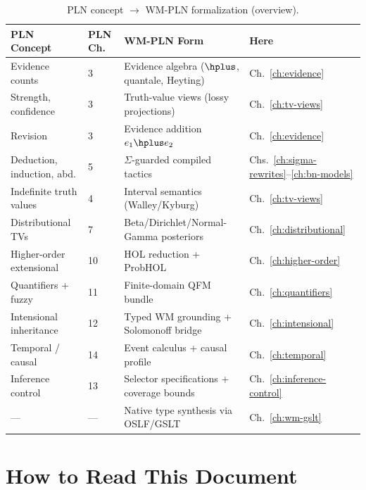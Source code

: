 \documentclass[11pt,openany]{report}
\begin{document}
\begin{table}[ht]
\centering
\caption{PLN concept $\to$ WM-PLN formalization (overview).}
\label{tab:concept-map}
\begin{tabular}{@{}llll@{}}
\toprule
\textbf{PLN Concept} & \textbf{PLN Ch.} & \textbf{WM-PLN Form} & \textbf{Here} \\
\midrule
Evidence counts           & 3  & Evidence algebra ($\hplus$, quantale, Heyting) & Ch.~\ref{ch:evidence} \\
Strength, confidence      & 3  & Truth-value views (lossy projections)           & Ch.~\ref{ch:tv-views} \\
Revision                  & 3  & Evidence addition $e_1 \hplus e_2$              & Ch.~\ref{ch:evidence} \\
Deduction, induction, abd.& 5  & $\Sigma$-guarded compiled tactics               & Chs.~\ref{ch:sigma-rewrites}--\ref{ch:bn-models} \\
Indefinite truth values   & 4  & Interval semantics (Walley/Kyburg)              & Ch.~\ref{ch:tv-views} \\
Distributional TVs        & 7  & Beta/Dirichlet/Normal-Gamma posteriors           & Ch.~\ref{ch:distributional} \\
Higher-order extensional  & 10 & HOL reduction + ProbHOL                         & Ch.~\ref{ch:higher-order} \\
Quantifiers + fuzzy       & 11 & Finite-domain QFM bundle                        & Ch.~\ref{ch:quantifiers} \\
Intensional inheritance   & 12 & Typed WM grounding + Solomonoff bridge           & Ch.~\ref{ch:intensional} \\
Temporal / causal         & 14 & Event calculus + causal profile                  & Ch.~\ref{ch:temporal} \\
Inference control         & 13 & Selector specifications + coverage bounds        & Ch.~\ref{ch:inference-control} \\
---                       & ---& Native type synthesis via OSLF/GSLT              & Ch.~\ref{ch:wm-gslt} \\
\bottomrule
\end{tabular}
\end{table}

\section{How to Read This Document}
\end{document}
